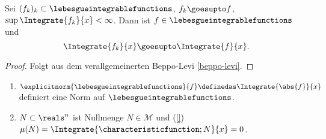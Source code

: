 \begin{satz}\label{beppo-levi-einfach}
  Sei \( (f_k)_k\subset \lebesgueintegrablefunctions \), \( f_k\goesupto f \), \( \sup \Integrate{f_k}{x}<\infty \). Dann ist \( f\in \lebesgueintegrablefunctions \) und 
  \begin{equation*}
    \Integrate{f_k}{x}\goesupto \Integrate{f}{x}.
  \end{equation*}
\end{satz}
\begin{proof}
  Folgt aus dem verallgemeinerten Beppo-Levi \ref{beppo-levi}.
\end{proof}
\begin{folgerung}
  \begin{enumerate}
    \item\label{lebesgue_integrable_funktionen_norm} \( \explicitnorm{\lebesgueintegrablefunctions}{f}\definedas \Integrate{\abs{f}}{x} \) definiert eine Norm auf \( \lebesgueintegrablefunctions \).
    \item\label{nullmengen_funzen_mit_sigma_algebra} \( N\subset \reals^n \) ist Nullmenge \tiff \( N\in \mathcal{M} \) und  (\s \ref{}) \( \mu(N)=\Integrate{\characteristicfunction;{N}}{x}=0 \).
  \end{enumerate}
\end{folgerung}
